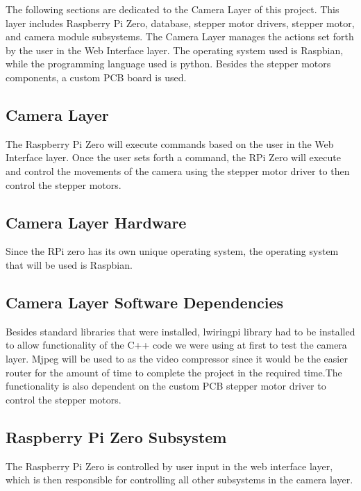 The following sections are dedicated to the Camera Layer of this project. This layer includes Raspberry Pi Zero, database, stepper motor drivers, stepper motor, and camera module subsystems. The Camera Layer manages the actions set forth by the user in the Web Interface layer. The operating system used is Raspbian, while the programming language used is python. Besides the stepper motors components, a custom PCB board is used.

\subsection{Camera Layer}
The Raspberry Pi Zero will execute commands based on the user in the Web Interface layer. Once the user sets forth a command, the RPi Zero will execute and control the movements of the camera using the stepper motor driver to then control the stepper motors.

\subsection{Camera Layer Hardware}
Since the RPi zero has its own unique operating system, the operating system that will be used is Raspbian. 

\subsection{Camera Layer Software Dependencies}
Besides standard libraries that were installed, lwiringpi library had to be installed to allow functionality of the C++ code we were using at first to test the camera layer. Mjpeg will be used to as the video compressor since it would be the easier router for the amount of time to complete the project in the required time.The functionality is also dependent on the custom PCB stepper motor driver to control the stepper motors.


\subsection{Raspberry Pi Zero Subsystem}
The Raspberry Pi Zero is controlled by user input in the web interface layer, which is then responsible for controlling all other subsystems in the camera layer.


